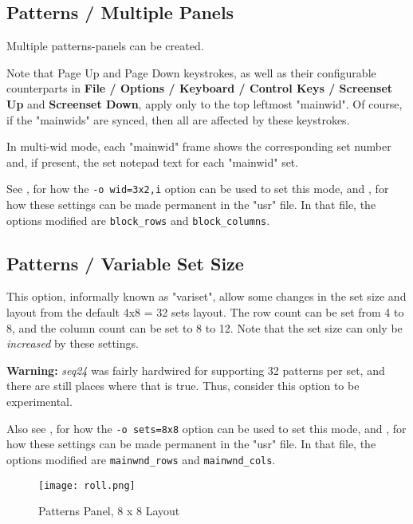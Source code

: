 \subsection{Patterns / Multiple Panels}
\label{subsec:patterns_panel_multiple}

   Multiple patterns-panels can be created.

   Note that Page Up and Page Down keystrokes, as well as their
   configurable counterparts in
   \textbf{File / Options / Keyboard / Control Keys / Screenset Up}
   and \textbf{Screenset Down}, apply only to the top leftmost "mainwid".
   Of course, if the "mainwids" are synced, then all are affected by these
   keystrokes.

   In multi-wid mode, each "mainwid" frame shows the corresponding set number
   and, if present, the set notepad text for each "mainwid" set.

   See 
   , for how the
   \texttt{-o wid=3x2,i} option can be used to set this mode, and
   , for
   how these settings can be made permanent in the "usr" file.
   In that file, the options modified are \texttt{block\_rows} and
   \texttt{block\_columns}.

\subsection{Patterns / Variable Set Size}
\label{subsec:patterns_panel_variset}

   This option, informally known as "variset", allow some changes in
   the set size and layout from the default 4x8 = 32 sets layout.
   The row count can be set from 4 to 8, and the column count can be set to 8
   to 12.  Note that the set size can only be \textsl{increased} by these
   settings.

   \textbf{Warning:}
   \textsl{seq24} was fairly hardwired for supporting 32 patterns per
   set, and there are still places where that is true.  Thus,
   consider this option to be experimental.

   Also see 
   , for how the
   \texttt{-o sets=8x8} option can be used to set this mode, and
   , for
   how these settings can be made permanent in the "usr" file.
   In that file, the options modified are \texttt{mainwnd\_rows} and
   \texttt{mainwnd\_cols}.

\begin{figure}[H]
   \centering 
   \texttt{[image: roll.png]}
   \caption{Patterns Panel, 8 x 8 Layout}
   \label{fig:pattern_window_bottom_panel_variset}
\end{figure}

